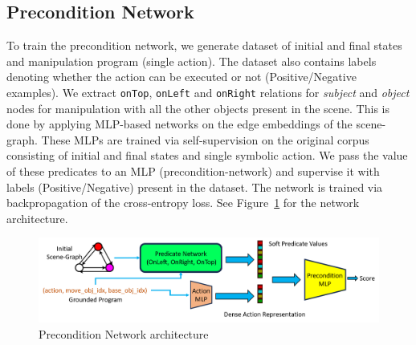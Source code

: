 \subsection{Precondition Network}
To train the precondition network, we generate dataset of initial and final states and manipulation program (single action). The dataset also contains labels denoting whether the action can be executed or not (Positive/Negative examples). We extract \texttt{onTop}, \texttt{onLeft} and \texttt{onRight} relations for \textit{subject} and \textit{object} nodes for manipulation with all the other objects present in the scene. This is done by applying MLP-based networks on the edge embeddings of the scene-graph. These MLPs are trained via self-supervision on the original corpus consisting of initial and final states and single symbolic action. We pass the value of these predicates to an MLP (precondition-network) and supervise it with labels (Positive/Negative) present in the dataset. The network is trained via backpropagation of the cross-entropy loss. See Figure~\ref{fig:precond} for the network architecture.

\begin{figure}
    \centering
    \includegraphics[width=\textwidth]{assets/precond.png}
    \caption{Precondition Network architecture}
    \label{fig:precond}
\end{figure}